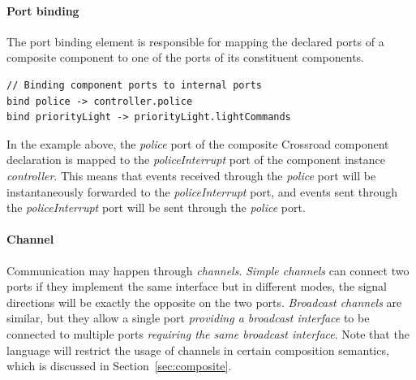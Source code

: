 \paragraph{Port binding} The port binding element is responsible for mapping the declared ports of a composite component to one of the ports of its constituent components.


\begin{lstlisting}
// Binding component ports to internal ports
bind police -> controller.police
bind priorityLight -> priorityLight.lightCommands
\end{lstlisting}

In the example above, the \emph{police} port of the composite Crossroad component declaration is mapped to the \emph{policeInterrupt} port of the component instance \emph{controller}. This means that events received through the \emph{police} port will be instantaneously forwarded to the \emph{policeInterrupt} port, and events sent through the \emph{policeInterrupt} port will be sent through the \emph{police} port.

\paragraph{Channel} 
Communication may happen through \emph{channels}. \emph{Simple channels} can connect two ports if they implement the same interface but in different modes, \ie the signal directions will be exactly the opposite on the two ports. \emph{Broadcast channels} are similar, but they allow a single port \emph{providing a broadcast interface} to be connected to multiple ports \emph{requiring the same broadcast interface}. Note that the language will restrict the usage of channels in certain composition semantics, which is discussed in Section~\ref{sec:composite}.

